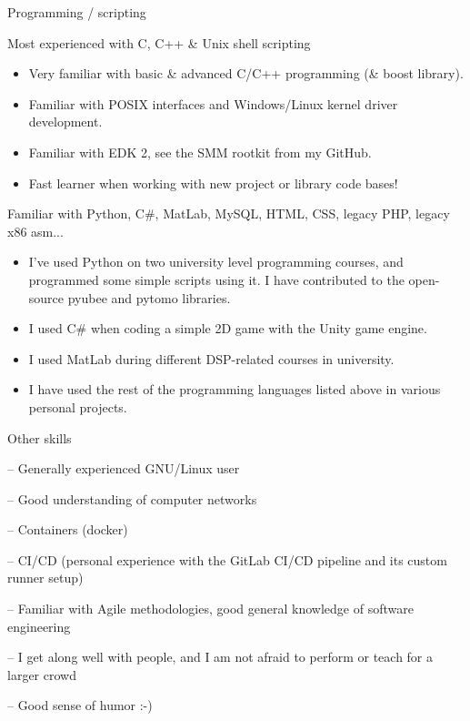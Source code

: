 \documentclass[a4paper,hidelinks,10pt]{article}
\newlength{\cvcolumngapwidth}
\newlength{\cvleftcolumnwidth}
\newlength{\cvrightcolumnwidth}
\newcommand{\cvheadingstyle}[1]{{\normalsize\cvheadingfont\textcolor{cvheadingcolor}{#1}}}
\newlength{\cvafteritemskipamount}
\newlength{\cvparskip}
\newcommand{\cvitem}[2]{
    \begin{minipage}[t]{\cvleftcolumnwidth}
        \raggedleft #1
    \end{minipage}%
    \hspace{\cvcolumngapwidth}%
    \begin{minipage}[t]{\cvrightcolumnwidth}
        \setlength{\parskip}{\cvparskip} #2
    \end{minipage}

    \vspace{\cvafteritemskipamount}
}
\begin{document}
\cvitem{
    \cvheadingstyle{Programming / scripting}
}{
    Most experienced with C, C++ \& Unix shell scripting
    \begin{itemize}
        \item Very familiar with basic \& advanced C/C++ programming (\& boost library).
        \item Familiar with POSIX interfaces and Windows/Linux kernel driver development.
        \item Familiar with EDK 2, see the SMM rootkit from my GitHub.
        \item Fast learner when working with new project or library code bases!
    \end{itemize}
    
	\vspace{0.2cm}
    Familiar with Python, C\#, MatLab, MySQL, HTML, CSS, legacy PHP, legacy x86 asm...
    \begin{itemize}
        \item I've used Python on two university level programming courses, and programmed some simple scripts using it. I have contributed to the open-source pyubee and pytomo libraries.
        \item I used C\# when coding a simple 2D game with the Unity game engine.
        \item I used MatLab during different DSP-related courses in university.
        \item I have used the rest of the programming languages listed above in various personal projects.
    \end{itemize}
    
}

\cvitem{
    \cvheadingstyle{Other skills}
}{
    
    -- Generally experienced GNU/Linux user

    -- Good understanding of computer networks
    
    -- Containers (docker)
    
    -- CI/CD (personal experience with the GitLab CI/CD pipeline and its custom runner setup)
    
    -- Familiar with Agile methodologies, good general knowledge of software engineering
    
    -- I get along well with people, and I am not afraid to perform or teach for a larger crowd
    
    -- Good sense of humor :-)
}


\end{document}
